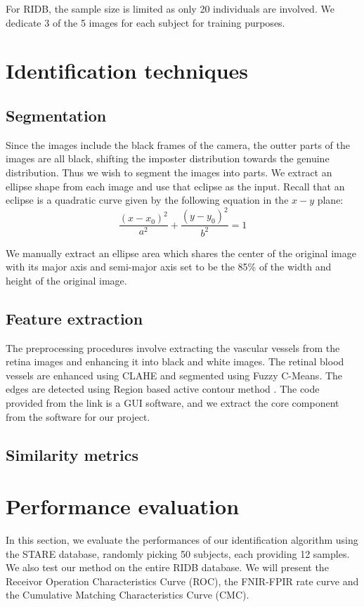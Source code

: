 \documentclass[a4paper,11pt]{article}
\theoremstyle{plain} %
\begin{document}
For RIDB, the sample size is limited as only 20 individuals are involved. We dedicate 3 of the 5 images for each subject for training purposes.


\section{Identification techniques}

\subsection{Segmentation}
Since the images include the black frames of the camera, the outter parts of the images are all black, shifting the imposter distribution towards the genuine distribution. Thus we wish to segment the images into parts. We extract an ellipse shape from each image and use that eclipse as the input. Recall that an eclipse is a quadratic curve given by the following equation in the $x-y$ plane:
$$\frac{(x-x_0)^2}{a^2} + \frac{(y-y_0)^2}{b^2} = 1$$

We manually extract an ellipse area which shares the center of the original image with its major axis and semi-major axis set to be the 85\% of the width and height of the original image. 	 

\subsection{Feature extraction}
The preprocessing procedures involve extracting the vascular vessels from the retina images and enhancing it into black and white images. The retinal blood vessels are enhanced using CLAHE and segmented using Fuzzy C-Means. The edges are detected using Region based active contour method \cite{segmentation2017web}. The code provided from the link is a GUI software, and we extract the core component from the software for our project.

\subsection{Similarity metrics}


\section{Performance evaluation}

In this section, we evaluate the performances of our identification algorithm using the STARE database, randomly picking 50 subjects, each providing 12 samples. We also test our method on the entire RIDB database. We will present the Receivor Operation Characteristics Curve (ROC), the FNIR-FPIR rate curve and the Cumulative Matching Characteristics Curve (CMC).
\end{document}
